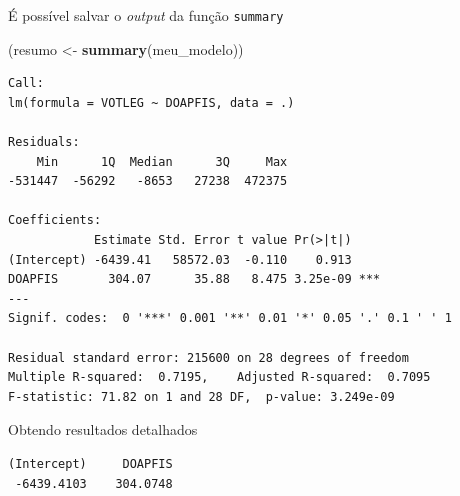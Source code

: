 \documentclass[
  9pt,
  ignorenonframetext,
  aspectratio=169]{beamer}
\newenvironment{Shaded}{\begin{snugshade}}{\end{snugshade}}
\newcommand{\KeywordTok}[1]{\textcolor[rgb]{0.13,0.29,0.53}{\textbf{#1}}}
\newcommand{\NormalTok}[1]{#1}
\newcommand{\OperatorTok}[1]{\textcolor[rgb]{0.81,0.36,0.00}{\textbf{#1}}}
\newcommand{\StringTok}[1]{\textcolor[rgb]{0.31,0.60,0.02}{#1}}
\begin{document}
\begin{frame}[fragile]{É possível salvar o \emph{output} da função
\texttt{summary}}
\protect\hypertarget{uxe9-possuxedvel-salvar-o-output-da-funuxe7uxe3o-summary}{}
\begin{Shaded}
\begin{Highlighting}[]
\NormalTok{(resumo \textless{}{-}}\StringTok{ }\KeywordTok{summary}\NormalTok{(meu\_modelo))}
\end{Highlighting}
\end{Shaded}

\begin{verbatim}
Call:
lm(formula = VOTLEG ~ DOAPFIS, data = .)

Residuals:
    Min      1Q  Median      3Q     Max 
-531447  -56292   -8653   27238  472375 

Coefficients:
            Estimate Std. Error t value Pr(>|t|)    
(Intercept) -6439.41   58572.03  -0.110    0.913    
DOAPFIS       304.07      35.88   8.475 3.25e-09 ***
---
Signif. codes:  0 '***' 0.001 '**' 0.01 '*' 0.05 '.' 0.1 ' ' 1

Residual standard error: 215600 on 28 degrees of freedom
Multiple R-squared:  0.7195,    Adjusted R-squared:  0.7095 
F-statistic: 71.82 on 1 and 28 DF,  p-value: 3.249e-09
\end{verbatim}
\end{frame}

\begin{frame}[fragile]{Obtendo resultados detalhados}
\protect\hypertarget{obtendo-resultados-detalhados}{}
\begin{Shaded}
\end{Shaded}

\begin{verbatim}
(Intercept)     DOAPFIS 
 -6439.4103    304.0748 
\end{verbatim}
\end{frame}
\end{document}
